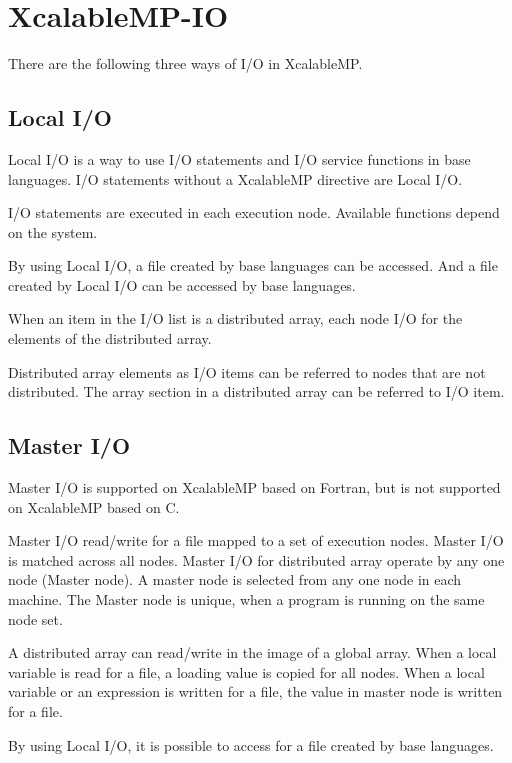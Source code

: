 
 \section{XcalableMP-IO}

 There are the following three ways of I/O in XcalableMP.

  \subsection{Local I/O}

  Local I/O is a way to use I/O statements and I/O service functions in
  base languages. 
  I/O statements without a XcalableMP directive are Local I/O.

  I/O statements are executed in each execution node. Available functions
  depend on the system.

  By using Local I/O, a file created by base languages can be accessed.
  And a file created by Local I/O can be accessed by base languages.

  When an item in the I/O list is a distributed array, each
  node I/O for the elements of the distributed array.

  Distributed array elements as I/O items can be referred to nodes that are
  not distributed.
  The array section in a distributed array can be referred to I/O item.


  \subsection{Master I/O}

  Master I/O is supported on XcalableMP based on Fortran, but is not
  supported on XcalableMP based on C.

  Master I/O read/write for a file mapped to a set of execution
  nodes.
  Master I/O is matched across all nodes.
  Master I/O for distributed array operate by any one node (Master
  node).
  A master node is selected from any one node in each machine.
  The Master node is unique, when a program is running on the same node
  set. 

  A distributed array can read/write in the image of a global array.
  When a local variable is read for a file, a loading value is copied
  for all nodes. When a local variable or an expression is written for a
  file, the value in master node is written for a file.

  By using Local I/O, it is possible to access for a file created by
  base languages.


